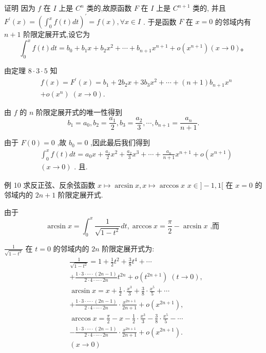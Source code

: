 证明 因为 $f$ 在 $I$ 上是 ${C}^{n}$ 类的,故原函数 $F$ 在 $I$ 上是 ${C}^{n + 1}$ 类的, 并且 ${F}^{\prime }\left( x\right)  = {\left( {\int }_{0}^{x}f\left( t\right) dt\right) }^{\prime } = f\left( x\right) ,\forall x \in  I$ . 于是函数 $F$ 在 $x = 0$ 的邻域内有 $n + 1$ 阶限定展开式,设它为
$${\int }_{0}^{x}f\left( t\right) {dt} = {b}_{0} + {b}_{1}x + {b}_{2}{x}^{2} + \cdots  + {b}_{n + 1}{x}^{n + 1} + o\left( {x}^{n + 1}\right) \left( {x \rightarrow  0}\right) 。$$

由定理 $8 \cdot  3 \cdot  5$ 知
\begin{align*}
	&f\left( x\right)  = {F}^{\prime }\left( x\right)  = {b}_{1} + 2{b}_{2}x + 3{b}_{3}{x}^{2} + \cdots  + \left( {n + 1}\right) {b}_{n + 1}{x}^{n}\\
	&+ o\left( {x}^{n}\right) \;\left( {x \rightarrow  0}\right) .
\end{align*}

由 $f$ 的 $n$ 阶限定展开式的唯一性得到
$${b}_{1} = {a}_{0},{b}_{2} = \frac{{a}_{1}}{2},{b}_{3} = \frac{{a}_{2}}{3},\cdots ,{b}_{n + 1} = \frac{{a}_{n}}{n + 1}.$$

由于 $F\left( 0\right)  = 0$ ,故 ${b}_{0} = 0$ ,因此最后我们得到
\begin{align*}
	&{\int }_{0}^{x}f\left( t\right) {dt} = {a}_{0}x + \frac{{a}_{1}}{2}{x}^{2} + \frac{{a}_{2}}{3}{x}^{3} + \cdots  + \frac{{a}_{n}}{n + 1}{x}^{n + 1} + o\left( {x}^{n + 1}\right)\\
	&\left( {x \rightarrow  0}\right) \text{ . 且. }
\end{align*}

例 10 求反正弦、反余弦函数 $x \mapsto  \arcsin x,x \mapsto  \arccos x$  $x \in  \rbrack  - 1,1\lbrack$ 在 $x = 0$ 的邻域内的 ${2n} + 1$ 阶限定展开式.

由于
$$\arcsin x = {\int }_{0}^{x}\frac{1}{\sqrt{1 - {t}^{2}}}{dt},\arccos x = \frac{\pi }{2} - \arcsin x\text{ ,而 }$$

$\frac{1}{\sqrt{1 - {t}^{2}}}$ 在 $t = 0$ 的邻域内的 ${2n}$ 阶限定展开式为:
\begin{align*}
	&\frac{1}{\sqrt{1 - {t}^{2}}} = 1 + \frac{1}{2}{t}^{2} + \frac{3}{8}{t}^{4} + \cdots\\
	&+ \frac{1 \cdot  3 \cdot  \cdots  \cdot  \left( {{2n} - 1}\right) }{2 \cdot  4 \cdot  \cdots  \cdot  {2n}}{t}^{2n} + o\left( {t}^{{2n} + 1}\right) \;\left( {t \rightarrow  0}\right) ,\\
	&\arcsin x = x + \frac{1}{2} \cdot  \frac{{x}^{3}}{3} + \frac{3}{8} \cdot  \frac{{x}^{5}}{5} + \cdots\\
	&+ \frac{1 \cdot  3 \cdot  \cdots  \cdot  \left( {{2n} - 1}\right) }{2 \cdot  4 \cdot  \cdots  \cdot  {2n}} \cdot  \frac{{x}^{{2n} + 1}}{{2n} + 1} + o\left( {x}^{{2n} + 1}\right) ,\\
	&\arccos x = \frac{\pi }{2} - x - \frac{1}{2} \cdot  \frac{{x}^{3}}{3} - \frac{3}{8} \cdot  \frac{{x}^{5}}{5} - \cdots\\
	&- \frac{1 \cdot  3 \cdot  \cdots  \cdot  \left( {{2n} - 1}\right) }{2 \cdot  4 \cdot  \cdots  \cdot  {2n}} \cdot  \frac{{x}^{{2n} + 1}}{{2n} + 1} + o\left( {x}^{{2n} + 1}\right) .\\
	&\left( {x \rightarrow  0}\right)
\end{align*}

